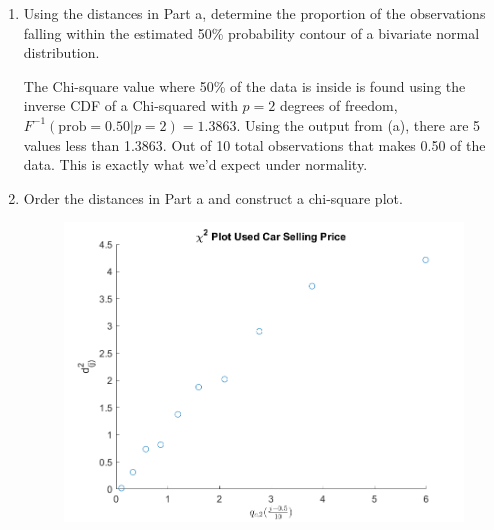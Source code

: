 \begin{enumerate}[label= (\alph*)]
\[\begin{bNiceArray}{rr}
             0.8 & -3.5410 \\
             2.8 & -4.9910 \\
             3.8 & -6.4810 \\
             5.8 & -8.4910
        \end{bNiceArray}
        =
        \begin{bNiceArray}{c}
            1.8753 \\
            2.0203 \\
            2.9009 \\
            0.7353 \\
            0.3105 \\
            0.0176 \\
            3.7329 \\
            0.8165 \\
            1.3753 \\
            4.2153
        \end{bNiceArray}
    \]
    \item Using the distances in Part a, determine the proportion of the observations falling
    within the estimated 50\% probability contour of a bivariate normal distribution.
    \vspace{0.2cm}
    \par
    The Chi-square value where 50\% of the data is inside is found using the inverse CDF of a Chi-squared with $p = 2$ degrees of freedom, $F^{-1}(\text{prob} = 0.50| p = 2) = 1.3863$. Using the output from (a), there are 5 values less than 1.3863. Out of 10 total observations that makes 0.50 of the data. This is exactly what we'd expect under normality.

    \item Order the distances in Part a and construct a chi-square plot.
    
    \begin{figure}[H]
        \includegraphics[scale=0.8]{./matlab/chapter-4/sol4.26c.png}
    \end{figure}


\end{enumerate}
